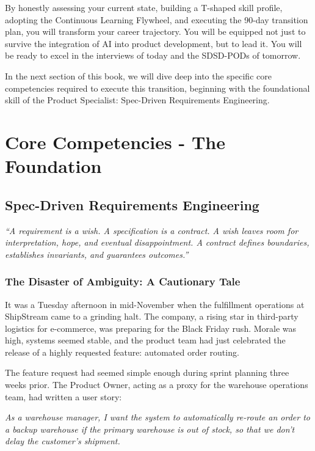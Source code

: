 \documentclass[
  11pt,
  openany,
  oneside]{book}
\renewenvironment{quote}{\begin{customquote}}{\end{customquote}}
\begin{document}
By honestly assessing your current state, building a T-shaped skill
profile, adopting the Continuous Learning Flywheel, and executing the
90-day transition plan, you will transform your career trajectory. You
will be equipped not just to survive the integration of AI into product
development, but to lead it. You will be ready to excel in the
interviews of today and the SDSD-PODs of tomorrow.

In the next section of this book, we will dive deep into the specific
core competencies required to execute this transition, beginning with
the foundational skill of the Product Specialist: Spec-Driven
Requirements Engineering.

\part{Core Competencies - The Foundation}

\chapter{Spec-Driven Requirements
Engineering}\label{spec-driven-requirements-engineering}

\begin{quote}
\emph{``A requirement is a wish. A specification is a contract. A wish
leaves room for interpretation, hope, and eventual disappointment. A
contract defines boundaries, establishes invariants, and guarantees
outcomes.''}
\end{quote}

\section{The Disaster of Ambiguity: A Cautionary
Tale}\label{the-disaster-of-ambiguity-a-cautionary-tale}

It was a Tuesday afternoon in mid-November when the fulfillment
operations at ShipStream came to a grinding halt. The company, a rising
star in third-party logistics for e-commerce, was preparing for the
Black Friday rush. Morale was high, systems seemed stable, and the
product team had just celebrated the release of a highly requested
feature: automated order routing.

The feature request had seemed simple enough during sprint planning
three weeks prior. The Product Owner, acting as a proxy for the
warehouse operations team, had written a user story:

\emph{As a warehouse manager, I want the system to automatically
re-route an order to a backup warehouse if the primary warehouse is out
of stock, so that we don't delay the customer's shipment.}
\end{document}
